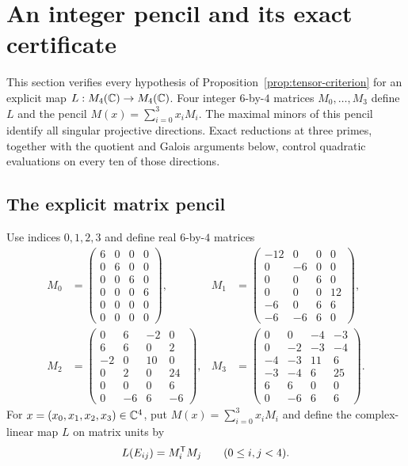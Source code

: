 \section{An integer pencil and its exact certificate}
\label{sec:certificate}

This section verifies every hypothesis of Proposition~\ref{prop:tensor-criterion}
for an explicit map $L:M_{4}(\mathbb C)\to M_{4}(\mathbb C)$.  Four integer $6$-by-$4$ matrices
$M_0,\ldots,M_3$ define $L$ and the pencil $M(x)=\sum_{i=0}^3x_iM_i$.
The maximal minors of this pencil identify all singular projective directions.
Exact reductions at three primes, together with the quotient and Galois
arguments below, control quadratic evaluations on every ten of those
directions.

\subsection{The explicit matrix pencil}

Use indices $0,1,2,3$ and define real $6$-by-$4$ matrices
\begin{equation}
\begin{aligned}
M_0&=\begin{pmatrix}
6&0&0&0\\0&6&0&0\\0&0&6&0\\0&0&0&6\\0&0&0&0\\0&0&0&0
 \end{pmatrix},&
M_1&=\begin{pmatrix}
-12&0&0&0\\0&-6&0&0\\0&0&6&0\\0&0&0&12\\-6&0&6&6\\-6&-6&6&0
 \end{pmatrix},\\[2mm]
M_2&=\begin{pmatrix}
0&6&-2&0\\6&6&0&2\\-2&0&10&0\\0&2&0&24\\0&0&0&6\\0&-6&6&-6
 \end{pmatrix},&
M_3&=\begin{pmatrix}
0&0&-4&-3\\0&-2&-3&-4\\-4&-3&11&6\\-3&-4&6&25\\6&6&0&0\\0&-6&6&6
 \end{pmatrix}.
\end{aligned}
\label{eq:explicit-matrices}
\end{equation}
For $x=(x_0,x_1,x_2,x_3)\in\mathbb C^4$, put $M(x)=\sum_{i=0}^3x_iM_i$ and define
the complex-linear map $L$ on matrix units by
\begin{equation}
 L(E_{ij})=M_i^{\mathsf T}M_j\qquad(0\leq i,j<4).
 \label{eq:L}
\end{equation}

